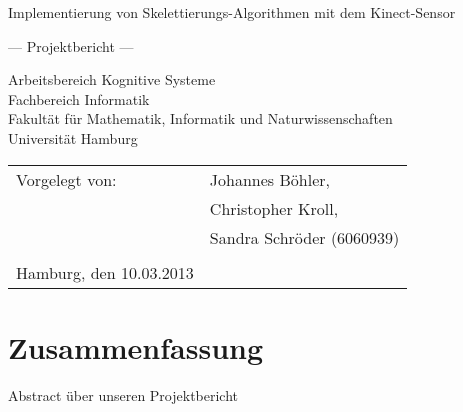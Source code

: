 \documentclass[
	12pt,
	a4paper,
	BCOR10mm,
	DIV14,
	listof=totoc,
	bibliography=totoc,
	headsepline
]{scrreprt}
\begin{document}
\begin{titlepage}
	\begin{center}
		{\titlefont\huge Implementierung von Skelettierungs-Algorithmen mit dem Kinect-Sensor\par}

		\bigskip
		\bigskip

		{\titlefont\Large --- Projektbericht ---\par}

		\bigskip
		\bigskip

		{\large Arbeitsbereich Kognitive Systeme\\
		Fachbereich Informatik\\
		Fakultät für Mathematik, Informatik und Naturwissenschaften\\
		Universität Hamburg\par}
	\end{center}
	
	\vfill
	
	{\large \begin{tabular}{ll}
		Vorgelegt von: & Johannes Böhler, \\
				& Christopher Kroll, \\ 
				& Sandra Schröder (6060939) \\\\
		Hamburg, den 10.03.2013
	  \end{tabular}\par}

\end{titlepage}

\newcommand{\Autor}[1]{{\hfill \Large \textit{Autor: #1}}}

\chapter*{Zusammenfassung}

\thispagestyle{empty}

Abstract über unseren Projektbericht

\tableofcontents












\end{document}
